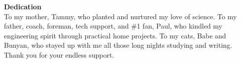 \hspace{0pt}\vfill
{\centering\large\textbf{Dedication}\\
\normalsize\vspace{\baselineskip}
 To my mother, Tammy, who planted and nurtured my love of science. To my father, coach, foreman, tech support, and \#1 fan, Paul, who kindled my engineering spirit through practical home projects. To my cats, Babe and Bunyan, who stayed up with me all those long nights studying and writing. Thank you for your endless support.\par
 }
\vfill\hspace{0pt}